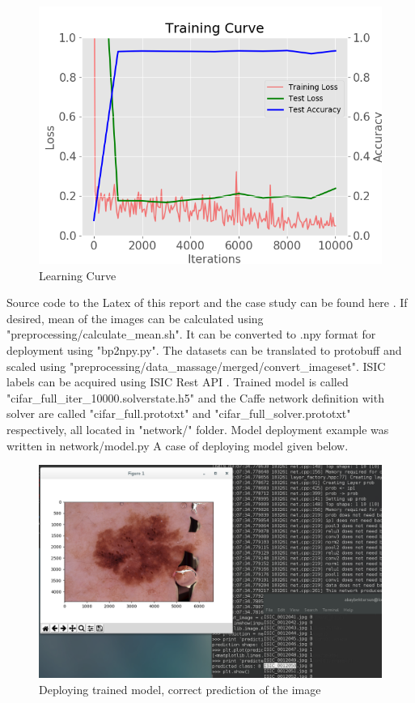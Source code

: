 \documentclass[paper=a4, fontsize=11pt]{scrartcl}
\numberwithin{equation}{section}		%
\numberwithin{figure}{section}			%
\numberwithin{table}{section}			%
\begin{document}
	
		\begin{figure}[!htb]
			\centering
			\includegraphics[scale=0.61]{trail_4.png}
			\caption{Learning Curve}
			\label{fig:learn}
		\end{figure}
		
	Source code to the Latex of this report and the case study can be found here \cite{sorucecode}.
	If desired, mean of the images can be calculated using "preprocessing/calculate\_mean.sh". It can be converted to .npy format for deployment using "bp2npy.py".
	The datasets can be translated to protobuff and scaled using  "preprocessing/data\_massage/merged/convert\_imageset". 
	ISIC labels can be acquired using ISIC Rest API \cite{ISIC}. 
	Trained model is called "cifar\_full\_iter\_10000.solverstate.h5" and the Caffe network definition with solver are called "cifar\_full.prototxt" and "cifar\_full\_solver.prototxt" respectively, all located in "network/" folder.
	Model deployment example was written in network/model.py
	A case of deploying model given below. \newline
	\begin{figure}[!htb]
		\centering
		\includegraphics[scale=0.42]{image.png}
		\caption{Deploying trained model, correct prediction of the image}
		\label{fig:example}
	\end{figure}
	
\newpage



\end{document}
